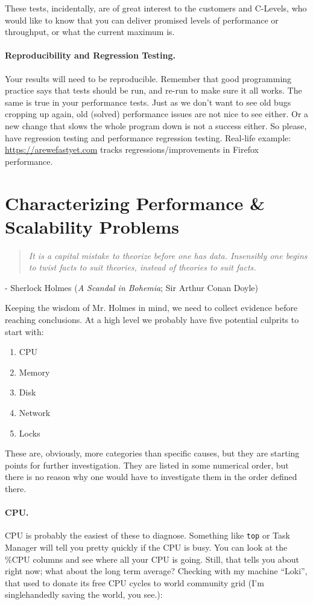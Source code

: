 These tests, incidentally, are of great interest to the customers and C-Levels, who would like to know that you can deliver promised levels of performance or throughput, or what the current maximum is.

\paragraph{Reproducibility and Regression Testing.}
Your results will need to be reproducible. Remember that good programming practice says that tests should be run, and re-run to make sure it all works. The same is true in your performance tests. Just as we don't want to see old bugs cropping up again, old (solved) performance issues are not nice to see either. Or a new change that slows the whole program down is not a success either. So please, have regression testing and performance regression testing. Real-life example: \url{https://arewefastyet.com} tracks regressions/improvements in Firefox performance.

\section*{Characterizing Performance \& Scalability Problems}

\begin{quote}
\textit{It is a capital mistake to theorize before one has data. Insensibly one begins to twist facts to suit theories, instead of theories to suit facts.}
\end{quote}
\hfill - Sherlock Holmes (\textit{A Scandal in Bohemia}; Sir Arthur Conan Doyle)

Keeping the wisdom of Mr. Holmes in mind, we need to collect evidence before reaching conclusions. At a high level we probably have five potential culprits to start with:
\begin{enumerate}
	\item CPU
	\item Memory
	\item Disk
	\item Network
	\item Locks
\end{enumerate}

These are, obviously, more categories than specific causes, but they are starting points for further investigation. They are listed in some numerical order, but there is no reason why one would have to investigate them in the order defined there.

\paragraph{CPU.} CPU is probably the easiest of these to diagnose. Something like \texttt{top} or Task Manager will tell you pretty quickly if the CPU is busy. You can look at the \%CPU columns and see where all your CPU is going. Still, that tells you about right now; what about the long term average? Checking with my machine ``Loki'', that used to donate its free CPU cycles to world community grid (I'm singlehandedly saving the world, you see.):

